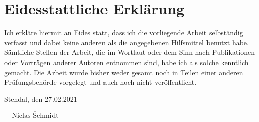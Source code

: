 \documentclass[a4paper,english,ngerman,oneside]{article}
\begin{document}
\section*{Eidesstattliche Erklärung}

\vspace{10mm}

Ich erkläre hiermit an Eides statt, dass ich die vorliegende Arbeit selbständig verfasst und dabei 
keine anderen als die angegebenen Hilfsmittel benutzt habe. Sämtliche Stellen der Arbeit, die im 
Wortlaut oder dem Sinn nach Publikationen oder Vorträgen anderer Autoren entnommen sind, habe ich 
als solche kenntlich gemacht. Die Arbeit wurde bisher weder gesamt noch in Teilen einer anderen 
Prüfungsbehörde vorgelegt und auch noch nicht veröffentlicht.

\vspace{10mm}

Stendal, den 27.02.2021

\begin{flushright}
    $ \overline{ ~~~~~\mbox{Niclas Schmidt} ~~~~~} $ 
\end{flushright}
\end{document}
